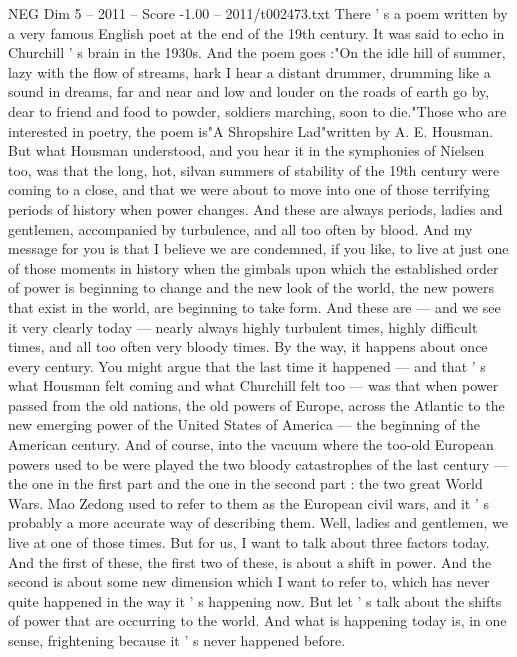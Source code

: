 \begin{textsample}{NEG Dim 5 – 2011 – Score -1.00 – 2011/t002473.txt}  \label{ex:f5_neg_050}
There ' s a poem written by a very famous English poet at the end of the 19th century.
It was said to echo in Churchill ' s brain in the 1930s.
And the poem goes :"On the idle hill of summer, lazy with the flow of streams, hark I hear a distant drummer, drumming like a sound in dreams, far and near and low and louder on the roads of earth go by, dear to friend and food to powder, soldiers marching, soon to die."Those who are interested in poetry, the poem is"A Shropshire Lad"written by A.
E.
Housman.
But what Housman understood, and you hear it in the symphonies of Nielsen too, was that the long, hot, silvan summers of stability of the 19th century were coming to a close, and that we were about to move into one of those terrifying periods of history when power changes.
And these are always periods, ladies and gentlemen, accompanied by turbulence, and all too often by blood.
And my message for you is that I believe we are condemned, if you like, to live at just one of those moments in history when the gimbals upon which the established order of power is beginning to change and the new look of the world, the new powers that exist in the world, are beginning to take form.
And these are — and we see it very clearly today — nearly always highly turbulent times, highly difficult times, and all too often very bloody times.
By the way, it happens about once every century.
You might argue that the last time it happened — and that ' s what Housman felt coming and what Churchill felt too — was that when power passed from the old nations, the old powers of Europe, across the Atlantic to the new emerging power of the United States of America — the beginning of the American century.
And of course, into the vacuum where the too-old European powers used to be were played the two bloody catastrophes of the last century — the one in the first part and the one in the second part : the two great World Wars.
Mao Zedong used to refer to them as the European civil wars, and it ' s probably a more accurate way of describing them.
Well, ladies and gentlemen, we live at one of those times.
But for us, I want to talk about three factors today.
And the first of these, the first two of these, is about a shift in power.
And the second is about some new dimension which I want to refer to, which has never quite happened in the way it ' s happening now.
But let ' s talk about the shifts of power that are occurring to the world.
And what is happening today is, in one sense, frightening because it ' s never happened before.

\end{textsample}
